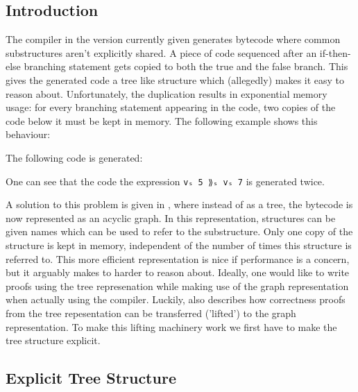 \documentclass[a4paper]{article}
\begin{document}
                     
        \subsection{Introduction}
        The compiler in the version currently given generates bytecode where common substructures aren't explicitly shared. A piece of code
        sequenced after an if-then-else branching statement gets copied to both the true and the false branch. This
        gives the generated code a tree like structure which (allegedly) makes it easy to reason about. Unfortunately, 
        the duplication results in exponential memory usage: for every branching statement appearing in the code, two 
        copies of the code below it must be kept in memory. The following example shows this behaviour:
        
        
        The following code is generated:
        
        
        One can see that the code the expression \texttt{vₛ 5 ⟫ₛ vₛ 7} is generated twice.
        
        A solution to this problem is given in \cite{compiler-correctness-structured-graphs},
        where instead of as a tree, the bytecode is now represented as an acyclic graph. In this representation, structures
        can be given names which can be used to refer to the substructure. Only one copy of the structure is kept in memory, 
        independent of the number of times this structure is referred to. This more efficient representation
        is nice if performance is a concern, but it arguably makes to harder to reason about. Ideally, one would like to 
        write proofs using the tree represenation while making use of the graph representation when actually using the compiler. 
        Luckily, \cite{compiler-correctness-structured-graphs} also describes how correctness proofs from the tree repesentation 
        can be transferred ('lifted') to the graph representation. To make this lifting machinery work we first have to make the 
        tree structure explicit.
                     
        
        \subsection{Explicit Tree Structure}
        
\end{document}

